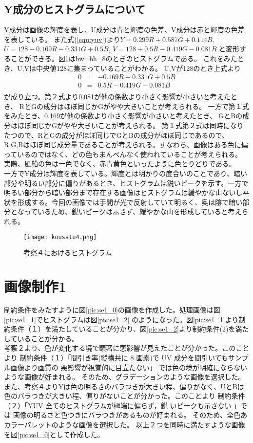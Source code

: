 \documentclass[a4j]{jsarticle}
\begin{document}
\subsection{Y成分のヒストグラムについて}
Y成分は画像の輝度を表し、U成分は青と輝度の色差、V成分は赤と輝度の色差を表している。
また式(\ref{equ:yuv})より$Y = 0.299R + 0.587G + 0.114B$,
$ U = 128 - 0.169R - 0.331G + 0.5B$,
$V = 128 + 0.5R - 0.419G - 0.081B$
と変形することができる。図\ref{pic:kousatu4}はbw=bh=8のときのヒストグラムである。
これをみたとき、U,Vは中央値128に集まっていることがわかる。
U,Vが128のとき上式より
\begin{eqnarray*}
   0 &=&-0.169R - 0.331G + 0.5B\\
   0 &=& 0.5R - 0.419G - 0.081B\\
\end{eqnarray*}
が成り立つ。第２式より0.081が他の係数より小さく影響が小さいと考えたとき、
RとGの成分はほぼ同じかGがやや大きいことが考えられる。
一方で第１式をみたとき、0.169が他の係数より小さく影響が小さいと考えたとき、
GとBの成分はほぼ同じかGがやや大きいことが考えられる。
第１式第２式は同時になりたつので、RとGの成分がほぼ同じでGとBの成分がほぼ同じであるので、
R,G,Bはほぼ同じ成分量であることが考えられる。すなわち、画像はある色に偏っているのではなく、どの色もまんべんなく使われていることが考えられる。
実際、風船の色は一色でなく、赤青黄色といったように色とりどりである。\\
一方でY成分は輝度を表している。輝度とは明かりの度合いのことであり、暗い部分や明るい部分に偏りがあるとき、ヒストグラムは鋭いピークを示す。一方で明るい部分から暗い部分まで存在する画像はヒストグラムは緩やかな山ないし平状を形成する。今回の画像では手間が光で反射していて明るく、奥は陰で暗い部分となっているため、鋭いピークは示さず、緩やかな山を形成していると考えられる。


\begin{figure}
  \centering
  \texttt{[image: kousatu4.png]}
  \caption{考察４におけるヒストグラム}
  \label{pic:kousatu4}
\end{figure}



\section{画像制作1}
制約条件をみたすように図\ref{pic:se1_0}の画像を作成した。処理画像は図\ref{pic:se1_1}でヒストグラムは図\ref{pic:se1_2} のようになった。図\ref{pic:se1_1}より制約条件（１）を満たしていることが分かり、図\ref{pic:se1_2}より制約条件(2)を満たしていることが分かる。\\
考察２より、色が変化する境で顕著に悪影響が見えたことが分かった。このことより
制約条件（１）「間引き率(縦横共に 8 画素)で UV
成分を間引いてもサンプル画像より画質の
悪影響が視覚的に目立たない」 では色の境が明確にならないような画像が好まれる。
そのため、グラデーションのような画像を選択した。
また、考察４よりYは色の明るさのバラつきが大きい程、偏りがなく、UとBは色のバラつきが大きい程、偏りがないことが分かった。このことより
制約条件（２）「YUV 全てのヒストグラムが極端に偏らず，鋭
いピークも示さない 」では
画像の明るさと色つきにバラつきがあるものが好まれる。
そのため、全色あカラーパレットのような画像を選択した。
以上２つを同時に満たすような画像を図\ref{pic:se1_0}として作成した。
\end{document}
